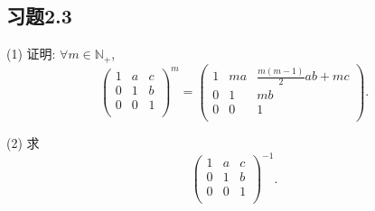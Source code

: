 \documentclass{ctexart}
\begin{document}
\subsection{习题2.3}
\begin{exercise}%
    (1) 证明: $\forall m\in\mathbb{N}_+$,
    \[\begin{pmatrix}
        1 & a & c \\
        0 & 1 & b \\
        0 & 0 & 1 \\
    \end{pmatrix}^m=\begin{pmatrix}
        1 & ma & \frac{m(m-1)}{2}ab+mc \\
        0 & 1 & mb \\
        0 & 0 & 1 \\
    \end{pmatrix}.\]

    (2) 求
    \[\begin{pmatrix}
        1 & a & c \\
        0 & 1 & b \\
        0 & 0 & 1 \\
    \end{pmatrix}^{-1}.\]
\end{exercise}
\end{document}
